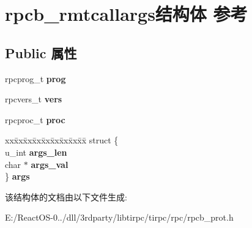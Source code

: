 \hypertarget{structrpcb__rmtcallargs}{}\section{rpcb\+\_\+rmtcallargs结构体 参考}
\label{structrpcb__rmtcallargs}
\subsection*{Public 属性}
\begin{DoxyCompactItemize}
\item 
\mbox{\label{structrpcb__rmtcallargs_abe3084626d49136ac449ee23e8b9c49e}} 
rpcprog\+\_\+t {\bfseries prog}
\item 
\mbox{\label{structrpcb__rmtcallargs_a792f611c6c632c8e134a2b2fd5288cba}} 
rpcvers\+\_\+t {\bfseries vers}
\item 
\mbox{\label{structrpcb__rmtcallargs_a4d1d0a7117476e59a3fe9cb1f2d0e20b}} 
rpcproc\+\_\+t {\bfseries proc}
\item 
\mbox{\label{structrpcb__rmtcallargs_ac958c346bd3aa094c655bc6149d8f763}} 
\begin{tabbing}
xx\=xx\=xx\=xx\=xx\=xx\=xx\=xx\=xx\=\kill
struct \{\\
\>u\_int {\bfseries args\_len}\\
\>char $\ast$ {\bfseries args\_val}\\
\} {\bfseries args}\\

\end{tabbing}\end{DoxyCompactItemize}


该结构体的文档由以下文件生成\+:\begin{DoxyCompactItemize}
\item 
E\+:/\+React\+O\+S-\/0../dll/3rdparty/libtirpc/tirpc/rpc/rpcb\+\_\+prot.\+h\end{DoxyCompactItemize}
